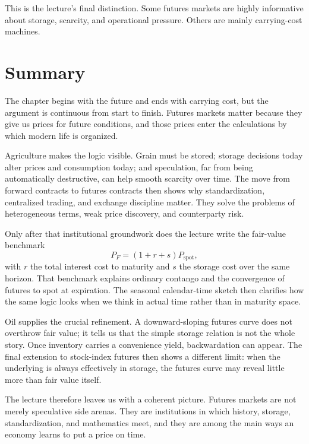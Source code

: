 This is the lecture's final distinction. Some futures markets are highly informative about storage, scarcity, and operational pressure. Others are mainly carrying-cost machines.

\section{Summary}

The chapter begins with the future and ends with carrying cost, but the argument is continuous from start to finish. Futures markets matter because they give us prices for future conditions, and those prices enter the calculations by which modern life is organized.

Agriculture makes the logic visible. Grain must be stored; storage decisions today alter prices and consumption today; and speculation, far from being automatically destructive, can help smooth scarcity over time. The move from forward contracts to futures contracts then shows why standardization, centralized trading, and exchange discipline matter. They solve the problems of heterogeneous terms, weak price discovery, and counterparty risk.

Only after that institutional groundwork does the lecture write the fair-value benchmark
\[
P_F=(1+r+s)P_{\text{spot}},
\]
with $r$ the total interest cost to maturity and $s$ the storage cost over the same horizon. That benchmark explains ordinary contango and the convergence of futures to spot at expiration. The seasonal calendar-time sketch then clarifies how the same logic looks when we think in actual time rather than in maturity space.

Oil supplies the crucial refinement. A downward-sloping futures curve does not overthrow fair value; it tells us that the simple storage relation is not the whole story. Once inventory carries a convenience yield, backwardation can appear. The final extension to stock-index futures then shows a different limit: when the underlying is always effectively in storage, the futures curve may reveal little more than fair value itself.

The lecture therefore leaves us with a coherent picture. Futures markets are not merely speculative side arenas. They are institutions in which history, storage, standardization, and mathematics meet, and they are among the main ways an economy learns to put a price on time.